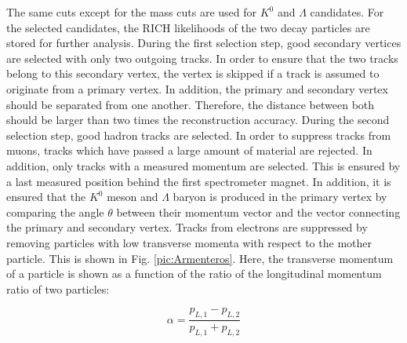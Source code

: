 The same cuts except for the mass cuts are used for $K^0$ and $\Lambda$ candidates. For the selected candidates, the RICH likelihoods of the two decay particles are stored for further analysis. During the first selection step, good secondary vertices are selected with only two outgoing tracks. In order to ensure that the two tracks belong to this secondary vertex, the vertex is skipped if a track is assumed to originate from a primary vertex. In addition, the primary and secondary vertex should be separated from one another. Therefore, the distance between both should be larger than two times the reconstruction accuracy.
During the second selection step, good hadron tracks are selected. In order to suppress tracks from muons, tracks which have passed a large amount of material are rejected. In addition, only tracks with a measured momentum are selected. This is ensured by a last measured position behind the first spectrometer magnet. In addition, it is ensured that the $K^0$ meson and $\Lambda$ baryon is produced in the primary vertex by comparing the angle $\theta$ between their momentum vector and the vector connecting the primary and secondary vertex. Tracks from electrons are suppressed by removing particles with low transverse momenta with respect to the mother particle. This is shown in Fig. \ref{pic:Armenteros}. Here, the transverse momentum of a particle is shown as a function of the ratio of the longitudinal momentum ratio of two particles:

\begin{equation}
  \alpha = \frac{p_{L,1}-p_{L,2}}{p_{L,1}+p_{L,2}}
\end{equation}

